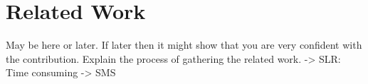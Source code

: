 \iffalse  \fi
\chapter{Related Work}
May be here or later. If later then it might show that you are very confident with the contribution. Explain the process of gathering the related work.
-> SLR: Time consuming
-> SMS